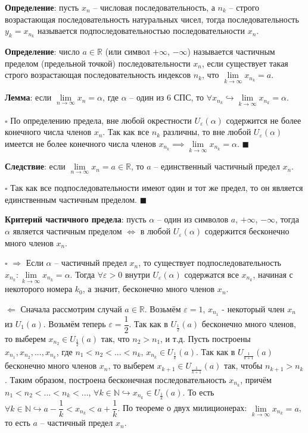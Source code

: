 \documentclass[12pt, a4paper, reqno]{article}
\begin{document}
    \textbf{Определение}: пусть $x_n$ -- числовая последовательность, а $n_k$ -- строго возрастающая
    последовательность натуральных чисел, тогда последовательность $y_k = x_{n_k}$ называется
    подпоследовательностью последовательности $x_n$.

    \textbf{Определение}: число $a\in\mathbb{R}$ (или символ $+\infty$, $-\infty$) называется
    частичным пределом (предельной точкой) последовательности $x_n$, если существует такая строго
    возрастающая последовательность индексов $n_k$, что $\lim\limits_{k\to\infty} x_{n_k} = a$.

    \textbf{Лемма}: если $\lim\limits_{n\to\infty} x_n = \alpha$, где $\alpha$ -- один из 6 СПС, то
    $\forall x_{n_k} \hookrightarrow \lim\limits_{k\to\infty} x_{n_k} = \alpha$.

    $\square$ По определению предела, вне любой окрестности $U_{\varepsilon}(\alpha)$ содержится не
    более конечного числа членов $x_n$. Так как все $n_k$ различны, то вне любой
    $U_{\varepsilon}(\alpha)$ имеется не более конечного числа членов $x_{n_k} \implies
    \lim\limits_{k\to\infty} x_{n_k} = \alpha$. $\blacksquare$

    \textbf{Следствие}: если  $\lim\limits_{n\to\infty} x_n = a\in\mathbb{R}$, то $a$ -- единственный
    частичный предел $x_n$.

    $\square$ Так как все подпоследовательности имеют один и тот же предел, то он является единственным
    частичным пределом. $\blacksquare$

    \textbf{Критерий частичного предела}: пусть $\alpha$ -- один из символов $a$, $+\infty$, $-\infty$,
    тогда $\alpha$ является частичным пределом $\iff$ в любой $U_{\varepsilon}(\alpha)$ содержится
    бесконечно много членов $x_n$.

    $\square$ $\boxed{\Rightarrow}$ Если $\alpha$ -- частичный предел $x_n$, то существует подпоследовательность
    $x_{n_k}: \lim\limits_{k\to\infty} x_{n_k} = \alpha$. Тогда $\forall \varepsilon > 0$ внутри
    $U_{\varepsilon}(\alpha)$ содержатся все $x_{n_k}$, начиная с некоторого номера $k_0$, а значит,
    бесконечно много членов $x_n$.

    $\boxed{\Leftarrow}$ Сначала рассмотрим случай $a\in\mathbb{R}$. Возьмём $\varepsilon = 1$, $x_{n_1}$
    - некоторый член $x_n$ из $U_{1}(a)$. Возьмём теперь $\varepsilon = \dfrac{1}{2}$. Так как в
    $U_{\frac{1}{2}}(a)$ бесконечно много членов, то выберем $x_{n_2}\in U_{\frac{1}{2}}(a)$ так,
    что $n_2 > n_1$, и т.д. Пусть построены $x_{n_1}, x_{n_2}, ..., x_{n_k}$, где
    $n_1 < n_2 < ... < n_k$, $x_{n_k}\in U_{\frac{1}{k}}(a)$. Так как в $U_{\frac{1}{k+1}}(a)$
    бесконечно много членов $x_n$, то выберем $x_{k+1}\in U_{\frac{1}{k+1}}(a)$ так, чтобы
    $n_{k+1} > n_k$. Таким образом, построена бесконечная последовательность $x_{n_k}$, причём
    $n_1 < n_2 < ... < n_k < ...$, $\forall k\in\mathbb{N} \hookrightarrow x_{n_k}\in U_{\frac{1}{k}}(a)$.
    То есть $\forall k\in\mathbb{N} \hookrightarrow a - \dfrac{1}{k} < x_{n_k} < a + \dfrac{1}{k}$.
    По теореме о двух милиционерах: $\lim\limits_{k\to\infty} x_{n_k} = a$, то есть $a$ -- частичный
    предел $x_n$.
\end{document}
